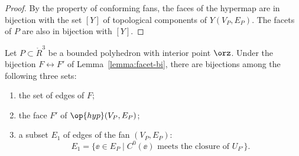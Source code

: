 \begin{proof} By the  property of conforming fans,
the faces of the hypermap are in bijection with the set
$[Y]$ of topological components of $Y(V_P,E_P)$.  The facets of $P$
are also in bijection with $[Y]$.
\end{proof}

\begin{lemma}[]\label{lemma:edge-bi}
Let $P\subset \ring{R}^3$ be a bounded polyhedron with interior point
$\orz$.  Under the bijection $F\leftrightarrow F'$ of Lemma~\ref{lemma:facet-bi},
there are bijections among the following three sets:
\begin{enumerate}
\item the set of edges of $F$;
\item the face $F'$ of $\op{hyp}(V_P,E_P)$;
\item a subset $E_1$ of edges of the fan $(V_P,E_P)$:
\[
E_1 = \{ \ee \in E_P \mid C^0(\ee) \text{ meets the closure of }  U_{F'}  \}.
\]
\end{enumerate}
\end{lemma}

